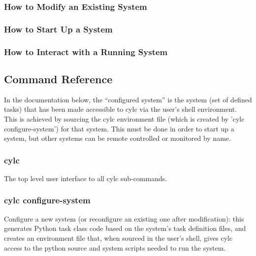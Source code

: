 \documentclass[11pt,a4paper]{article}
\begin{document}
\subsubsection{How to Modify an Existing System}

\subsubsection{How to Start Up a System}

\subsubsection{How to Interact with a Running System}

\subsection{Command Reference}

\lstset{
language=,
xleftmargin=2em,
basicstyle=\tiny
}

In the documentation below, the ``configured system'' is the system
(set of defined tasks) that has been made accessible to cylc via the
user's shell environment. This is achieved by sourcing the cylc
environment file (which is created by 'cylc configure-system') for that
system. This must be done in order to start up a system, but other
systems can be remote controlled or monitored by name.

\subsubsection{cylc}

The top level user interface to all cylc sub-commands.

{
\color{Magenta}

}

\subsubsection{cylc configure-system}

Configure a new system (or reconfigure an existing one after 
modification): this generates Python task class code based on 
the system's task definition files, and creates an environment 
file that, when sourced in the user's shell, gives cylc access to the
python source and system scripts needed to run the system.
{
\color{Magenta}

}
\end{document}
